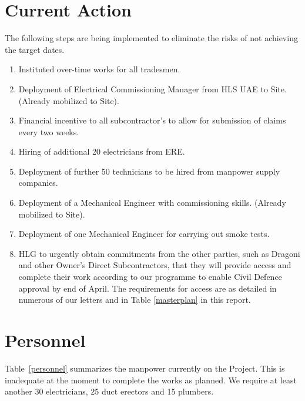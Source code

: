 \section*{Current Action}

The following steps are being implemented to eliminate the risks of not achieving the target dates.

\begin{enumerate}
\item  Instituted over-time works for all tradesmen.
\item  Deployment of Electrical Commissioning Manager from HLS UAE to Site. (Already mobilized to Site).
\item  Financial incentive to all subcontractor's to allow for submission of claims every two weeks.
\item  Hiring of additional 20 electricians from ERE.
\item  Deployment of further 50 technicians to be hired from manpower supply companies.
\item  Deployment of a Mechanical Engineer with commissioning skills.
(Already mobilized to Site).
\item  Deployment of one Mechanical Engineer for carrying out smoke tests.
\item HLG to urgently obtain commitments from the other parties, such as Dragoni and other Owner's Direct Subcontractors, that they will provide access and complete their work according to our programme to enable Civil Defence approval by end of April. The requirements for access are as detailed in numerous of our letters and in Table \ref{masterplan} in this report.
\end{enumerate}


\section*{Personnel}


 Table~\ref{personnel} summarizes the manpower currently on the Project. This is inadequate at the moment to complete the works as planned. We require at least another 30 electricians, 25 duct erectors and 15 plumbers.

